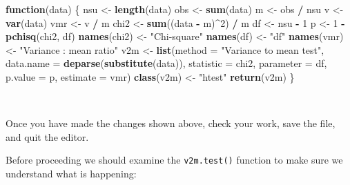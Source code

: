 \documentclass[12pt,a4paper]{book}
\newenvironment{Shaded}{\begin{snugshade}}{\end{snugshade}}
\newcommand{\KeywordTok}[1]{\textcolor[rgb]{0.13,0.29,0.53}{\textbf{#1}}}
\newcommand{\DataTypeTok}[1]{\textcolor[rgb]{0.13,0.29,0.53}{#1}}
\newcommand{\DecValTok}[1]{\textcolor[rgb]{0.00,0.00,0.81}{#1}}
\newcommand{\StringTok}[1]{\textcolor[rgb]{0.31,0.60,0.02}{#1}}
\newcommand{\ControlFlowTok}[1]{\textcolor[rgb]{0.13,0.29,0.53}{\textbf{#1}}}
\newcommand{\OperatorTok}[1]{\textcolor[rgb]{0.81,0.36,0.00}{\textbf{#1}}}
\newcommand{\NormalTok}[1]{#1}
\theoremstyle{definition}
\theoremstyle{definition}
\theoremstyle{definition}
\theoremstyle{remark}
\begin{document}
\begin{Shaded}
\begin{Highlighting}[]
\ControlFlowTok{function}\NormalTok{(data) \{}
\NormalTok{  nsu <-}\StringTok{ }\KeywordTok{length}\NormalTok{(data)}
\NormalTok{  obs <-}\StringTok{ }\KeywordTok{sum}\NormalTok{(data)}
\NormalTok{  m <-}\StringTok{ }\NormalTok{obs }\OperatorTok{/}\StringTok{ }\NormalTok{nsu}
\NormalTok{  v <-}\StringTok{ }\KeywordTok{var}\NormalTok{(data)}
\NormalTok{  vmr <-}\StringTok{ }\NormalTok{v }\OperatorTok{/}\StringTok{ }\NormalTok{m}
\NormalTok{  chi2 <-}\StringTok{ }\KeywordTok{sum}\NormalTok{((data }\OperatorTok{-}\StringTok{ }\NormalTok{m)}\OperatorTok{^}\DecValTok{2}\NormalTok{) }\OperatorTok{/}\StringTok{ }\NormalTok{m}
\NormalTok{  df <-}\StringTok{ }\NormalTok{nsu }\OperatorTok{-}\StringTok{ }\DecValTok{1}
\NormalTok{  p <-}\StringTok{ }\DecValTok{1} \OperatorTok{-}\StringTok{ }\KeywordTok{pchisq}\NormalTok{(chi2, df)}
  \KeywordTok{names}\NormalTok{(chi2) <-}\StringTok{ "Chi-square"}
  \KeywordTok{names}\NormalTok{(df) <-}\StringTok{ "df"}
  \KeywordTok{names}\NormalTok{(vmr) <-}\StringTok{ "Variance : mean ratio"}
\NormalTok{  v2m <-}\StringTok{ }\KeywordTok{list}\NormalTok{(}\DataTypeTok{method =} \StringTok{"Variance to mean test"}\NormalTok{,}
              \DataTypeTok{data.name =} \KeywordTok{deparse}\NormalTok{(}\KeywordTok{substitute}\NormalTok{(data)),}
              \DataTypeTok{statistic =}\NormalTok{ chi2,}
              \DataTypeTok{parameter =}\NormalTok{ df,}
              \DataTypeTok{p.value =}\NormalTok{ p,}
              \DataTypeTok{estimate =}\NormalTok{ vmr)}
  \KeywordTok{class}\NormalTok{(v2m) <-}\StringTok{ "htest"}
  \KeywordTok{return}\NormalTok{(v2m)}
\NormalTok{\}}
\end{Highlighting}
\end{Shaded}

~

Once you have made the changes shown above, check your work, save the
file, and quit the editor.

Before proceeding we should examine the \texttt{v2m.test()} function to
make sure we understand what is happening:
\end{document}
